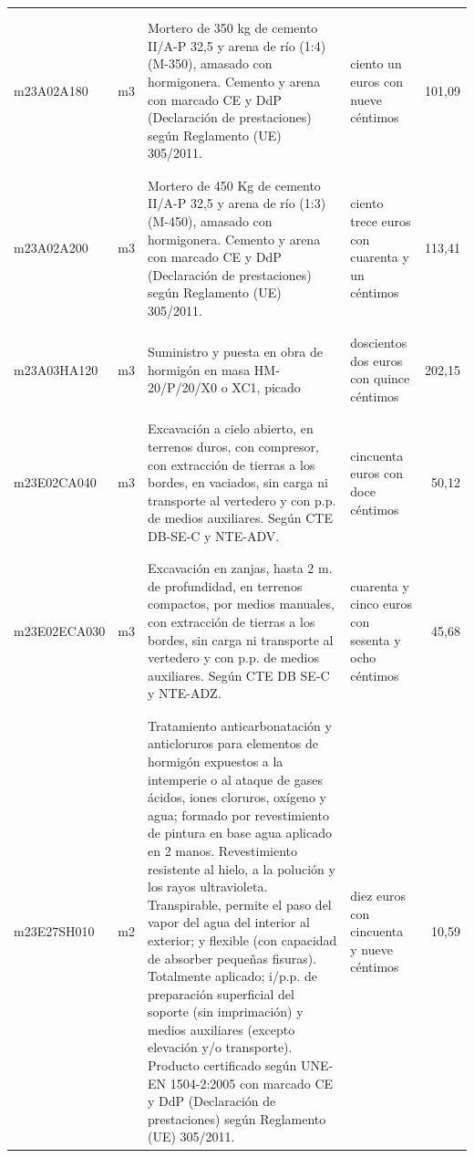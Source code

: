 \begin{supertabular}{|l|l|p{5cm}|p{3cm}|r|}
&&&&\\%
&&&&\\%
m23A02A180&m3&Mortero de 350 kg de cemento II/A{-}P 32,5 y arena de río (1:4) (M{-}350), amasado con hormigonera. Cemento y arena con marcado CE y DdP (Declaración de prestaciones) según Reglamento (UE) 305/2011.&ciento un euros con nueve céntimos&101,09\\%
&&&&\\%
&&&&\\%
m23A02A200&m3&Mortero de 450 Kg de cemento II/A{-}P 32,5 y arena de río (1:3) (M{-}450), amasado con hormigonera. Cemento y arena con marcado CE y DdP (Declaración de prestaciones) según Reglamento (UE) 305/2011.&ciento trece euros con cuarenta y un céntimos&113,41\\%
&&&&\\%
&&&&\\%
m23A03HA120&m3&Suministro y puesta en obra de hormigón en masa HM{-}20/P/20/X0 o XC1, picado&doscientos dos euros con quince céntimos&202,15\\%
&&&&\\%
&&&&\\%
m23E02CA040&m3&Excavación a cielo abierto, en terrenos duros, con compresor, con extracción de tierras a los bordes, en vaciados, sin carga ni transporte al vertedero y con p.p. de medios auxiliares. Según CTE DB{-}SE{-}C y NTE{-}ADV.&cincuenta euros con doce céntimos&50,12\\%
&&&&\\%
&&&&\\%
m23E02ECA030&m3&Excavación en zanjas, hasta 2 m. de profundidad, en terrenos compactos, por medios manuales, con extracción de tierras a los bordes, sin carga ni transporte al vertedero y con p.p. de medios auxiliares. Según CTE DB SE{-}C y NTE{-}ADZ.&cuarenta y cinco euros con sesenta y ocho céntimos&45,68\\%
&&&&\\%
&&&&\\%
m23E27SH010&m2&Tratamiento anticarbonatación y anticloruros para elementos de hormigón expuestos a la intemperie o al ataque de gases ácidos, iones cloruros, oxígeno y agua; formado por revestimiento de pintura en base agua aplicado en 2 manos. Revestimiento resistente al hielo, a la polución y los rayos ultravioleta. Transpirable, permite el paso del vapor del agua del interior al exterior; y flexible (con capacidad de absorber pequeñas fisuras). Totalmente aplicado; i/p.p. de preparación superficial del soporte (sin imprimación) y medios auxiliares (excepto elevación y/o transporte). Producto certificado según UNE{-}EN 1504{-}2:2005 con marcado CE y DdP (Declaración de prestaciones) según Reglamento (UE) 305/2011.&diez euros con cincuenta y nueve céntimos&10,59\\%

\end{supertabular}
